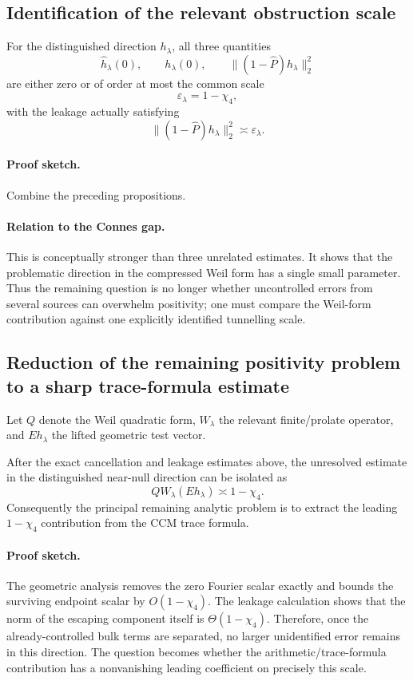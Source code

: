 \subsection{Identification of the relevant obstruction scale}
\begin{corollary}
For the distinguished direction \(h_\lambda\), all three quantities
\[
    \widehat h_\lambda(0),\qquad
    h_\lambda(0),\qquad
    \|(1-\widehat P)h_\lambda\|_2^2
\]
are either zero or of order at most the common scale
\[
    \varepsilon_\lambda=1-\chi_4,
\]
with the leakage actually satisfying
\[
    \|(1-\widehat P)h_\lambda\|_2^2\asymp\varepsilon_\lambda.
\]
\end{corollary}
\paragraph{Proof sketch.}
Combine the preceding propositions.
\paragraph{Relation to the Connes gap.}
This is conceptually stronger than three unrelated estimates.  It shows that
the problematic direction in the compressed Weil form has a single small
parameter.  Thus the remaining question is no longer whether uncontrolled
errors from several sources can overwhelm positivity; one must compare the
Weil-form contribution against one explicitly identified tunnelling scale.
\subsection{Reduction of the remaining positivity problem to a sharp
trace-formula estimate}
Let \(Q\) denote the Weil quadratic form, \(W_\lambda\) the relevant
finite/prolate operator, and \(E h_\lambda\) the lifted geometric test vector.
\begin{proposition}
After the exact cancellation and leakage estimates above, the unresolved
estimate in the distinguished near-null direction can be isolated as
\[
    QW_\lambda(Eh_\lambda)
    \asymp 1-\chi_4.
\]
Consequently the principal remaining analytic problem is to extract the
leading \(1-\chi_4\) contribution from the CCM trace formula.
\end{proposition}
\paragraph{Proof sketch.}
The geometric analysis removes the zero Fourier scalar exactly and bounds
the surviving endpoint scalar by \(O(1-\chi_4)\).  The leakage calculation
shows that the norm of the escaping component itself is
\(\Theta(1-\chi_4)\).  Therefore, once the already-controlled bulk terms are
separated, no larger unidentified error remains in this direction.
The question becomes whether the arithmetic/trace-formula contribution has a
nonvanishing leading coefficient on precisely this scale.
